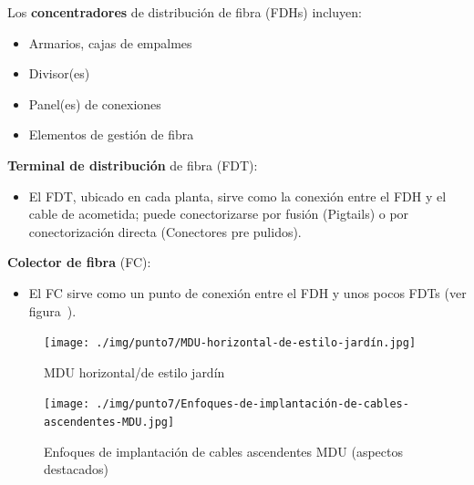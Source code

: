 \vfill


\clearpage


Los \textbf{concentradores} de distribución de fibra (FDHs) incluyen:

\begin{itemize}
\item Armarios, cajas de empalmes
\item Divisor(es)
\item Panel(es) de conexiones
\item Elementos de gestión de fibra
\end{itemize}



\textbf{Terminal de distribución} de fibra (FDT):

\begin{itemize}
\item El FDT, ubicado en cada planta, sirve como la conexión entre el FDH y el cable de acometida; puede conectorizarse por fusión (Pigtails) o por conectorización directa (Conectores pre pulidos).
\end{itemize}



\textbf{Colector de fibra} (FC):

\begin{itemize}
\item El FC sirve como un punto de conexión entre el FDH y unos pocos FDTs (ver figura~).
\end{itemize}


\begin{figure}[H]
	\centering
	\texttt{[image: ./img/punto7/MDU-horizontal-de-estilo-jardín.jpg]}
	\caption{MDU horizontal/de estilo jardín}
	\label{fig:Garden_MDU}
\end{figure}


\begin{figure}[H]
	\centering
	\texttt{[image: ./img/punto7/Enfoques-de-implantación-de-cables-ascendentes-MDU.jpg]}
	\caption{Enfoques de implantación de cables ascendentes MDU (aspectos destacados)}
	\label{fig:Ascendant_cables}
\end{figure}



